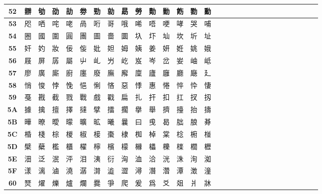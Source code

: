 \begin{table}[H]
\begin{tabular}{|Sc|Sc|Sc|Sc|Sc|Sc|Sc|Sc|Sc|Sc|Sc|Sc|Sc|Sc|Sc|}
\textbf{52} & 辧 & 劬 & 劭 & 劼 & 劵 & 勁 & 勍 & 勗 & 勞 & 勣 & 勦 & 飭 & 勠 & 勳 \\ \hline
\textbf{53} & 咫 & 哂 & 咤 & 咾 & 咼 & 哘 & 哥 & 哦 & 唏 & 唔 & 哽 & 哮 & 哭 & 哺 \\ \hline
\textbf{54} & 圈 & 國 & 圍 & 圓 & 團 & 圖 & 嗇 & 圜 & 圦 & 圷 & 圸 & 坎 & 圻 & 址 \\ \hline
\textbf{55} & 奸 & 妁 & 妝 & 佞 & 侫 & 妣 & 妲 & 姆 & 姨 & 姜 & 妍 & 姙 & 姚 & 娥 \\ \hline
\textbf{56} & 屐 & 屏 & 孱 & 屬 & 屮 & 乢 & 屶 & 屹 & 岌 & 岑 & 岔 & 妛 & 岫 & 岻 \\ \hline
\textbf{57} & 廖 & 廣 & 廝 & 廚 & 廛 & 廢 & 廡 & 廨 & 廩 & 廬 & 廱 & 廳 & 廰 & 廴 \\ \hline
\textbf{58} & 悄 & 悛 & 悖 & 悗 & 悒 & 悧 & 悋 & 惡 & 悸 & 惠 & 惓 & 悴 & 忰 & 悽 \\ \hline
\textbf{59} & 戞 & 戡 & 截 & 戮 & 戰 & 戲 & 戳 & 扁 & 扎 & 扞 & 扣 & 扛 & 扠 & 扨 \\ \hline
\textbf{5A} & 據 & 擒 & 擅 & 擇 & 撻 & 擘 & 擂 & 擱 & 擧 & 舉 & 擠 & 擡 & 抬 & 擣 \\ \hline
\textbf{5B} & 曄 & 暸 & 曖 & 曚 & 曠 & 昿 & 曦 & 曩 & 曰 & 曵 & 曷 & 朏 & 朖 & 朞 \\ \hline
\textbf{5C} & 棔 & 棧 & 棕 & 椶 & 椒 & 椄 & 棗 & 棣 & 椥 & 棹 & 棠 & 棯 & 椨 & 椪 \\ \hline
\textbf{5D} & 檗 & 蘗 & 檻 & 櫃 & 櫂 & 檸 & 檳 & 檬 & 櫞 & 櫑 & 櫟 & 檪 & 櫚 & 櫪 \\ \hline
\textbf{5E} & 沺 & 泛 & 泯 & 泙 & 泪 & 洟 & 衍 & 洶 & 洫 & 洽 & 洸 & 洙 & 洵 & 洳 \\ \hline
\textbf{5F} & 漾 & 漓 & 滷 & 澆 & 潺 & 潸 & 澁 & 澀 & 潯 & 潛 & 濳 & 潭 & 澂 & 潼 \\ \hline
\textbf{60} & 燹 & 燿 & 爍 & 爐 & 爛 & 爨 & 爭 & 爬 & 爰 & 爲 & 爻 & 爼 & 爿 & 牀 \\ \hline
\end{tabular}
\end{table}

